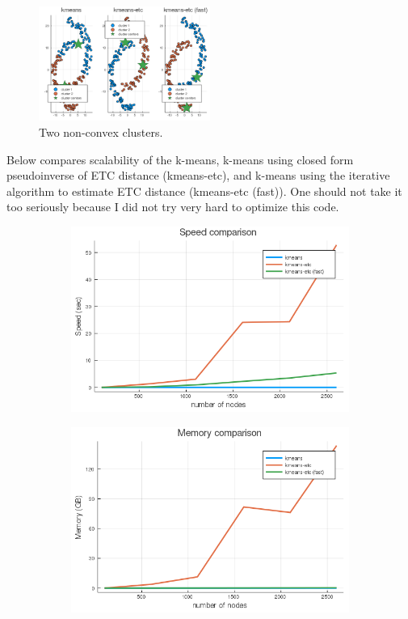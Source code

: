 \documentclass[./some_latex_template.tex]{subfiles}
\begin{document}
\begin{figure}[H]
	\centering    
    \includegraphics[width=0.5\textwidth]{figures/nonconvex.png}
    \caption{Two non-convex clusters.}
\end{figure}

Below compares scalability of the k-means, k-means using closed form pseudoinverse of ETC distance (kmeans-etc), and k-means using the iterative algorithm to estimate ETC distance (kmeans-etc (fast)). One should not take it too seriously because I did not try very hard to optimize this code. 

\begin{figure}[H]
  \begin{subfigure}[b]{0.45\textwidth}
    \includegraphics[width=\textwidth]{figures/speed.png}
  \end{subfigure}
  \begin{subfigure}[b]{0.45\textwidth}
    \includegraphics[width=\textwidth]{figures/memory.png}
  \end{subfigure}
\end{figure}
\end{document}
